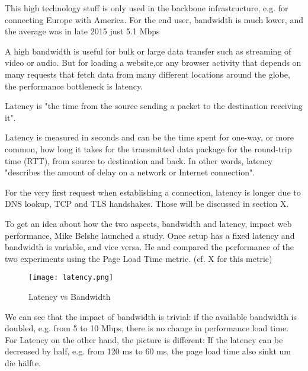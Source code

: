 This high technology stuff is only used in the backbone infrastructure, e.g. for connecting Europe with America.
For the end user, bandwidth is much lower, and the average was in late 2015 just 5.1 Mbps %

A high bandwidth is useful for bulk or large data transfer such as streaming of video or audio.
But for loading a website,or any browser activity that depends on many requests that fetch data from many different locations around the globe, the performance bottleneck is latency. %



Latency is "the time from the source sending a packet to the destination receiving it".  %

Latency is measured in seconds and can be the time spent for one-way, or more common, how long it takes for the transmitted data package for the round-trip time (RTT), from source to destination and back.
In other words, latency "describes the amount of delay on a network or Internet connection". %

For the very first request when establishing a connection, latency is longer due to DNS lookup, TCP and TLS handshakes.
Those will be discussed in section X. %



To get an idea about how the two aspects, bandwidth and latency, impact web performance,  Mike Belshe launched a study. %
Once setup has a fixed latency and bandwidth is variable, and vice versa.
He and compared the performance of the two experiments using the Page Load Time metric. (cf. X for this metric)


\begin{figure}[h!]
\begin{center}
\texttt{[image: latency.png]}
\caption{Latency vs Bandwidth}
\label{img:latency}
\end{center}
\end{figure}


We can see that the impact of bandwidth is trivial: if the available bandwidth is doubled, e.g. from 5 to 10 Mbps, there is no change in performance load time.
For Latency on the other hand, the picture is different: If the latency can be decreased by half, e.g. from 120 ms to 60 ms, the page load time also sinkt um die hälfte.

